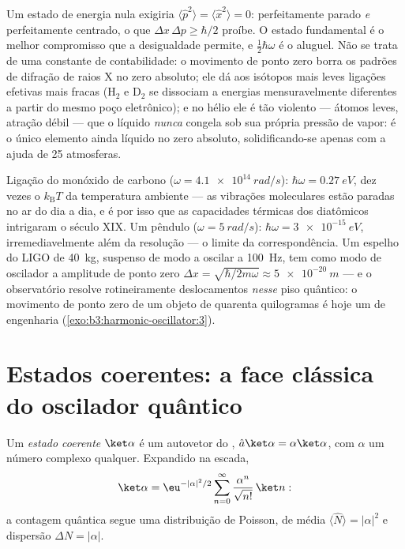 \begin{remark}\label{rem:b3:harmonic-oscillator:zeropoint}
Um estado de energia nula exigiria $\langle\hat p^2\rangle =
\langle\hat x^2\rangle = 0$: perfeitamente parado \emph{e}
perfeitamente centrado, o que $\Delta x\,\Delta p \ge \hbar/2$ proíbe.
O estado fundamental é o melhor compromisso que a desigualdade
permite, e $\tfrac12\hbar\omega$ é o aluguel. Não se trata de uma
constante de contabilidade: o movimento de ponto zero borra os padrões
de difração de raios X no zero absoluto; ele dá aos isótopos mais leves
ligações efetivas mais fracas (H$_2$ e D$_2$ se dissociam a energias
mensuravelmente diferentes a partir do mesmo poço eletrônico); e no
hélio ele é tão violento --- átomos leves, atração débil --- que o
líquido \emph{nunca} congela sob sua própria pressão de vapor: é o
único elemento ainda líquido no zero absoluto, solidificando-se apenas
com a ajuda de 25 atmosferas.
\end{remark}

\begin{example}\label{ex:b3:harmonic-oscillator:scales}
Ligação do monóxido de carbono ($\omega = \qty{4.1e14}{rad/s}$): $\hbar\omega =
\qty{0.27}{eV}$, dez vezes o $k_{\text{B}}T$ da
temperatura ambiente --- as vibrações moleculares estão paradas no
ar do dia a dia, e é por isso que as capacidades térmicas dos
diatômicos intrigaram o século XIX. Um pêndulo
($\omega = \qty{5}{rad/s}$): $\hbar\omega = \qty{3e-15}{eV}$,
irremediavelmente além da resolução --- o limite da correspondência. Um
espelho do LIGO de \qty{40}{kg}, suspenso de modo a oscilar a
\qty{100}{Hz}, tem como modo de oscilador a amplitude de ponto zero $\Delta x =
\sqrt{\hbar/2m\omega} \approx \qty{5e-20}{m}$ --- e o observatório
resolve rotineiramente deslocamentos \emph{nesse} piso quântico: o
movimento de ponto zero de um objeto de quarenta quilogramas é hoje um
 de engenharia (\cref{exo:b3:harmonic-oscillator:3}).
\end{example}

\section{Estados coerentes: a face clássica do oscilador quântico}

\begin{definition}\label{def:b3:harmonic-oscillator:coherent}
Um \emph{estado coerente} $\ket\alpha$ é um autovetor do , $\hat a\ket\alpha = \alpha\ket\alpha$, com $\alpha$ um
número complexo qualquer. Expandido na escada,
\[
\ket\alpha = \eu^{-|\alpha|^2/2}\sum_{n=0}^\infty
\frac{\alpha^n}{\sqrt{n!}}\,\ket n :
\]
a contagem quântica segue uma distribuição de Poisson, de média $\langle\hat
N\rangle = |\alpha|^2$ e dispersão $\Delta N = |\alpha|$.
\end{definition}

